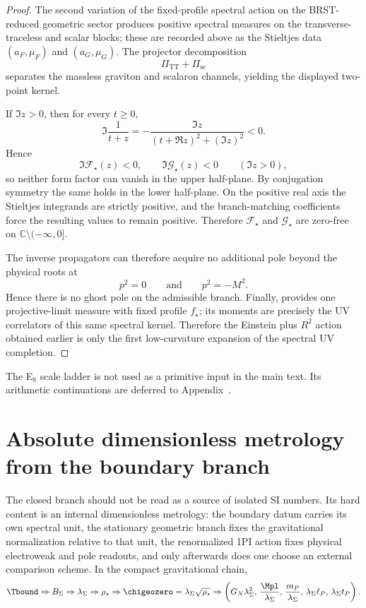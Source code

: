 \begin{proof}
The second variation of the fixed-profile spectral action on the BRST-reduced geometric sector
produces positive spectral measures on the transverse-traceless and scalar blocks; these are
recorded above as the Stieltjes data $(a_F,\mu_F)$ and $(a_G,\mu_G)$. The projector decomposition
\[
\Pi_{\mathrm{TT}}+\Pi_{\mathrm{sc}}
\]
separates the massless graviton and scalaron channels, yielding the displayed two-point kernel.

If $\Im z>0$, then for every $t\ge 0$,
\[
\Im\frac{1}{t+z}
=
-\frac{\Im z}{(t+\Re z)^2+(\Im z)^2}
<0.
\]
Hence
\[
\Im \mathcal F_\star(z)<0,
\qquad
\Im \mathcal G_\star(z)<0
\qquad
(\Im z>0),
\]
so neither form factor can vanish in the upper half-plane. By conjugation symmetry the same holds
in the lower half-plane. On the positive real axis the Stieltjes integrands are strictly positive,
and the branch-matching coefficients force the resulting values to remain positive. Therefore
$\mathcal F_\star$ and $\mathcal G_\star$ are zero-free on
$\mathbb C\setminus(-\infty,0]$.

The inverse propagators can therefore acquire no additional pole beyond the physical roots at
\[
p^2=0
\qquad\text{and}\qquad
p^2=-M^2.
\]
Hence there is no ghost pole on the admissible branch. Finally,
 provides one projective-limit measure with fixed profile
$f_\star$; its moments are precisely the UV correlators of this same spectral kernel. Therefore the
Einstein plus $R^2$ action obtained earlier is only the first low-curvature expansion of the
spectral UV completion.
\end{proof}

The E$_8$ scale ladder is not used as a primitive input in the main text. Its arithmetic
continuations are deferred to Appendix~.


\section{Absolute dimensionless metrology from the boundary branch}
\label{sec:absolute-dimensionless-metrology}

The closed branch should not be read as a source of isolated SI numbers. Its hard content is an
internal dimensionless metrology: the boundary datum carries its own spectral unit, the stationary
geometric branch fixes the gravitational normalization relative to that unit, the renormalized 1PI
action fixes physical electroweak and pole readouts, and only afterwards does one choose an
external comparison scheme.
In the compact gravitational chain,
\[
\Tbound
\Rightarrow
B_\Sigma
\Rightarrow
\lambda_\Sigma
\Rightarrow
\rho_\star
\Rightarrow
\chigeozero=\lambda_\Sigma\sqrt{\rho_\star}
\Rightarrow
\left(
G_N\lambda_\Sigma^2,\,
\frac{\Mpl}{\lambda_\Sigma},\,
\frac{m_P}{\lambda_\Sigma},\,
\lambda_\Sigma\ell_P,\,
\lambda_\Sigma t_P
\right).
\]

